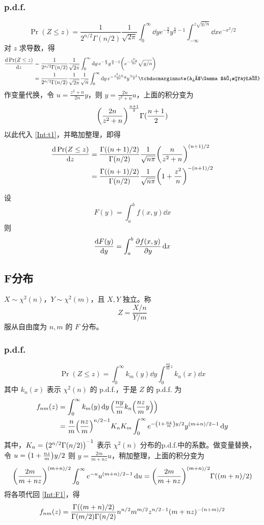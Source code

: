 \documentclass[12pt,uft8]{ctexrep}
\begin{document}
\subsubsection{p.d.f.}
\[
    \Pr(Z\le z)=\frac{1}{2^{n/2}\Gamma(n/2)}\frac{1}{\sqrt{2\pi}} \int_0^\infty \dd{y}e^{-\frac{y}{2}}  y^{\frac{n}{2}-1}\int_{-\infty}^{z\sqrt{y/n}}\dd{x} e^{-x^2/2}
\]
对 $z$ 求导数，得 
\begin{align}
    \dv{\Pr(Z\le z)}{z} &= \frac{1}{2^{n/2}\Gamma(n/2)}\frac{1}{\sqrt{2\pi}} \int_0^\infty \dd{y}e^{-\frac{y}{2}}  y^{\frac{n}{2}-1} \qty(e^{-\frac{z^2y}{2n}} \sqrt{y/n}) \notag\\
&= \frac{1}{2^{n/2}\Gamma(n/2)}\frac{1}{\sqrt{2\pi}}\frac{1}{\sqrt{n}} \int_0^\infty \dd{y}e^{-\frac{z^2+n}{2n}y}  y^{\frac{n-1}{2}}\label{Int:t1} \tcbdocmarginnote{往$\Gamma$函数上凑}
\end{align}
作变量代换，令 $u = \frac{z^2+n}{2n}y$，则 $ y = \frac{2n}{z^2+n} u $，上面的积分变为
\[\qty(\frac{2n}{z^2+n})^{\frac{n+1}{2}}\Gamma(\frac{n+1}{2})\]
以此代入 \eqref{Int:t1}，并略加整理，即得 
\begin{align*} \dv{\Pr(Z\le z)}{z} &= \frac{\Gamma\qty((n+1)/2)}{\Gamma(n/2)}\frac{1}{\sqrt{n\pi}}\qty(\frac{n}{z^2+n})^{(n+1)/2} \\
    &= \frac{\Gamma\qty((n+1)/2)}{\Gamma(n/2)}\frac{1}{\sqrt{n\pi}}\qty(1+\frac{z^2}{n})^{-(n+1)/2}
\end{align*}



\begin{tcolorbox}[title=积分号下求导数]
设
\[F(y) = \int_a^b f(x, y)\dd{x}\]
则
\[\dv{F(y)}{y} = \int_a^b \pdv{f(x, y)}{y}\dd{x} \]    
\end{tcolorbox}

\subsection{F分布}
$X\sim \chi^2(n)$，$Y\sim\chi^2(m)$，且 $X,Y$ 独立。称
\[
    Z = \frac{X/n}{Y/m}
\]
服从自由度为 $n,m$ 的 $F$ 分布。

\subsubsection{p.d.f.}
\[\Pr(Z\le z) = \int_0^\infty k_m(y)\dd{y} \int_0^{\frac{ny}{m}z} k_n(x)\dd{x} \]
其中 $k_n(x)$ 表示 $\chi^2(n)$ 的 p.d.f.，于是 $Z$ 的 p.d.f. 为
\begin{align}
    f_{nm}(z) &= \int_0^\infty k_m(y)\dd{y}\qty(\frac{ny}{m} k_n\qty(\frac{nz}{m}y)) \notag\\
    &= \frac nm \qty(\frac{nz}{m})^{n/2-1} K_nK_m \int_0^\infty e^{-\qty(1+\frac{nz}{m})y/2} y^{(m+n)/2-1} \dd{y} \label{Int:F1}
\end{align}
其中，$K_n = \qty(2^{n/2}\Gamma(n/2))^{-1}$ 表示 $\chi^2(n)$ 分布的p.d.f.中的系数。做变量替换，令 $u = \qty(1+\frac{nz}{m})y/2$ 则 $ y = \frac{2m}{m+nz} u$，稍加整理，上面的积分变为
\[ 
    \qty(\frac{2m}{m+nz} )^{(m+n)/2} \int_0^\infty e^{-u} u^{(m+n)/2-1}\dd{u} =   \qty(\frac{2m}{m+nz} )^{(m+n)/2}\Gamma\qty((m+n)/2)
\]
将各项代回 \eqref{Int:F1}，得
\[
    f_{nm}(z) = \frac{\Gamma\qty((m+n)/2)}{\Gamma(m/2)\Gamma(n/2)}
n^{n/2} m^{m/2} z^{n/2-1} (m+nz)^{-(n+m)/2}
\]
\end{document}
